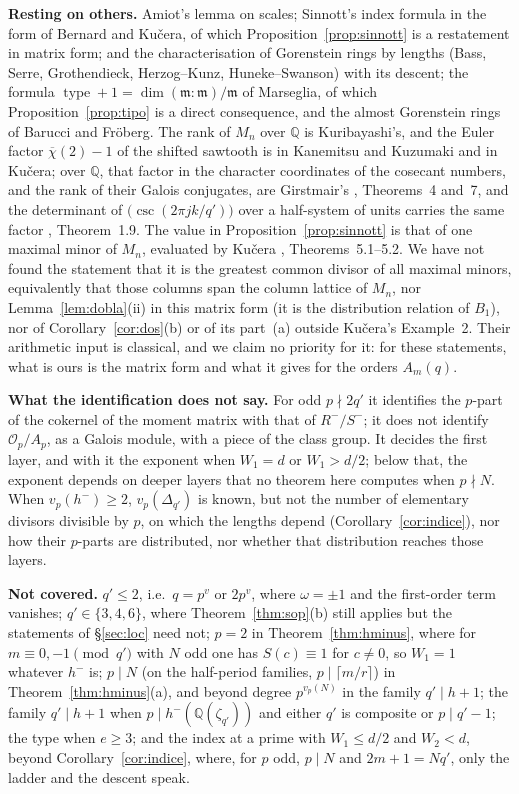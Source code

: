 \documentclass[11pt,a4paper]{article}
\theoremstyle{definition}
\newcommand{\QQ}{\mathbb{Q}}
\newcommand{\cO}{\mathcal{O}}
\begin{document}
\noindent\textbf{Resting on others.} Amiot's lemma on scales; Sinnott's index formula in the form of Bernard and
Kučera, of which Proposition~\ref{prop:sinnott} is a restatement in matrix form; and the characterisation of
Gorenstein rings by lengths (Bass, Serre, Grothendieck, Herzog--Kunz, Huneke--Swanson) with its descent; the
formula $\operatorname{type}+1=\dim(\mathfrak m:\mathfrak m)/\mathfrak m$ of Marseglia, of which Proposition~\ref{prop:tipo}
is a direct consequence, and the almost Gorenstein rings of Barucci and Fröberg. The rank of
$M_n$ over $\QQ$ is Kuribayashi's, and the Euler factor $\overline\chi(2)-1$ of the shifted sawtooth is in Kanemitsu and
Kuzumaki and in Kučera; over $\QQ$, that factor in the character coordinates of the cosecant numbers, and the rank
of their Galois conjugates, are Girstmair's \cite{Gir87}, Theorems~4 and~7, and the determinant of
$\bigl(\csc(2\pi jk/q')\bigr)$ over a half-system of units carries the same factor \cite{GG25}, Theorem~1.9. The value in Proposition~\ref{prop:sinnott} is that of one maximal minor of $M_n$, evaluated
by Kučera \cite{Kuc92}, Theorems~5.1--5.2. We have not found the statement that it is the greatest common divisor
of all maximal minors, equivalently that those columns span the column lattice of $M_n$, nor Lemma~\ref{lem:dobla}(ii) in this matrix form (it is the distribution relation of $B_1$), nor of
Corollary~\ref{cor:dos}(b) or of its part~(a) outside Kučera's Example~2. Their arithmetic input is classical, and we
claim no priority for it: for these statements, what is ours is the matrix form and what it gives for the orders
$A_m(q)$.

\noindent\textbf{What the identification does not say.} For odd $p\nmid 2q'$ it identifies the $p$-part of the
cokernel of the moment matrix with that of $R^-/S^-$; it does not identify $\cO_p/A_p$, as a Galois module, with a piece of the class
group. It decides the first layer, and with it the exponent when $W_1=d$ or $W_1>d/2$; below that, the exponent
depends on deeper layers that no theorem here computes when $p\nmid N$. When $v_p(h^-)\ge2$, $v_p(\Delta_{q'})$ is known, but
not the number of elementary divisors divisible by $p$, on which the lengths depend (Corollary~\ref{cor:indice}), nor
how their $p$-parts are distributed, nor whether that distribution reaches those layers.

\noindent\textbf{Not covered.} $q'\le2$, i.e.\ $q=p^v$ or $2p^v$, where $\omega=\pm1$ and the first-order term
vanishes; $q'\in\{3,4,6\}$, where Theorem~\ref{thm:sop}(b) still applies but the statements of \S\ref{sec:loc}
need not; $p=2$ in Theorem~\ref{thm:hminus}, where for $m\equiv0,-1\pmod{q'}$ with $N$ odd one has $S(c)\equiv1$ for $c\ne0$, so $W_1=1$ whatever $h^-$ is;
$p\mid N$ (on the half-period families, $p\mid\lceil m/r\rceil$) in Theorem~\ref{thm:hminus}(a), and beyond degree $p^{v_p(N)}$ in the family $q'\mid h+1$;
the family $q'\mid h+1$ when $p\mid h^-(\QQ(\zeta_{q'}))$ and
either $q'$ is composite or $p\mid q'-1$; the type when $e\ge3$; and the index at a prime with $W_1\le d/2$ and $W_2<d$, beyond
Corollary~\ref{cor:indice}, where, for $p$ odd, $p\mid N$ and $2m+1=Nq'$, only the ladder and the descent speak.
\end{document}
